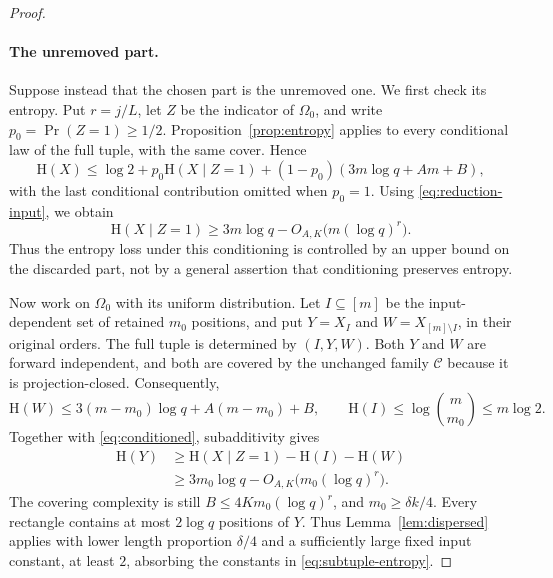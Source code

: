 \documentclass[11pt,a4paper]{article}
\numberwithin{equation}{section}
\newcommand{\HH}{\mathrm H}
\newcommand{\cC}{\mathcal C}
\begin{document}
\begin{proof}
\paragraph{The unremoved part.}
Suppose instead that the chosen part is the unremoved one.
We first check its entropy.
Put $r=j/L$, let $Z$ be the indicator of $\Omega_0$, and write
$p_0=\Pr(Z=1)\ge1/2$.
Proposition~\ref{prop:entropy} applies to every conditional law
of the full tuple, with the same cover. Hence
\[
 \HH(X)\le\log2+p_0\HH(X\mid Z=1)
 +(1-p_0)(3m\log q+Am+B),
\]
with the last conditional contribution omitted when $p_0=1$.
Using \eqref{eq:reduction-input}, we obtain
\begin{equation}\label{eq:conditioned}
 \HH(X\mid Z=1)
 \ge3m\log q-O_{A,K}\bigl(m(\log q)^r\bigr).
\end{equation}
Thus the entropy loss under this conditioning is controlled by
an upper bound on the discarded part, not by a general assertion
that conditioning preserves entropy.

Now work on $\Omega_0$ with its uniform distribution.
Let $I\subseteq[m]$ be the input-dependent set of retained
$m_0$ positions, and put $Y=X_I$ and
$W=X_{[m]\setminus I}$, in their original orders.
The full tuple is determined by $(I,Y,W)$.
Both $Y$ and $W$ are forward independent, and both are covered
by the unchanged family $\cC$ because it is projection-closed.
Consequently,
\[
 \HH(W)\le3(m-m_0)\log q+A(m-m_0)+B,
 \qquad \HH(I)\le\log\binom m{m_0}\le m\log2.
\]
Together with \eqref{eq:conditioned}, subadditivity gives
\begin{equation}\label{eq:subtuple-entropy}
 \begin{aligned}
 \HH(Y)
 &\ge\HH(X\mid Z=1)-\HH(I)-\HH(W)\\
 &\ge3m_0\log q-O_{A,K}\bigl(m_0(\log q)^r\bigr).
 \end{aligned}
\end{equation}
The covering complexity is still $B\le4Km_0(\log q)^r$,
and $m_0\ge\delta k/4$.
Every rectangle contains at most $2\log q$ positions of $Y$.
Thus Lemma~\ref{lem:dispersed} applies with lower length
proportion $\delta/4$ and a sufficiently large fixed input
constant, at least $2$, absorbing the constants in
\eqref{eq:subtuple-entropy}.


\end{proof}
\end{document}
